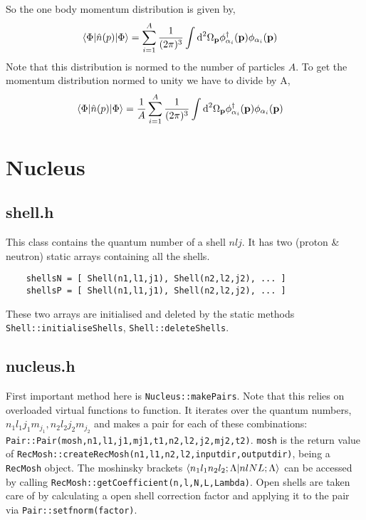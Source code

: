 \documentclass[10pt]{article}
\begin{document}
So the one body momentum distribution is given by,
\begin{align}
	\braket{ \Phi | \hat{n}(p) | \Phi} &=  \sum_{i=1}^{A} \frac{1}{(2 \pi)^{3}} \int \textrm{d}^{2} \Omega_{\mathbf{p}}\phi_{\alpha_i}^{\dagger}(\mathbf{p}) \phi_{\alpha_i}(\mathbf{p})
\end{align}
Note that this distribution is normed to the number of particles $A$. To get the momentum distribution normed to unity we have to divide by A,
\begin{align}
	\braket{ \Phi | \hat{n}(p) | \Phi} &=  \frac{1}{A} \sum_{i=1}^{A} \frac{1}{(2 \pi)^{3}} \int \textrm{d}^{2} \Omega_{\mathbf{p}}\phi_{\alpha_i}^{\dagger}(\mathbf{p}) \phi_{\alpha_i}(\mathbf{p})
\end{align}

\section{Nucleus}
\subsection{shell.h}
This class contains the quantum number of a shell $nlj$. It has two (proton \& neutron) static arrays containing all the shells.
\begin{verbatim}
	shellsN = [ Shell(n1,l1,j1), Shell(n2,l2,j2), ... ]
	shellsP = [ Shell(n1,l1,j1), Shell(n2,l2,j2), ... ]
\end{verbatim}
These two arrays are initialised and deleted by the static methods \texttt{Shell::initialiseShells}, \texttt{Shell::deleteShells}.

\subsection{nucleus.h}
First important method here is \texttt{Nucleus::makePairs}. Note that this relies on overloaded virtual functions to function. It iterates over the quantum numbers, $n_1 l_1 j_1 m_{j_1}, n_2 l_2 j_2 m_{j_2}$ and makes a pair for each of these combinations: \texttt{Pair::Pair(mosh,n1,l1,j1,mj1,t1,n2,l2,j2,mj2,t2)}. \texttt{mosh} is the return value of \texttt{RecMosh::createRecMosh(n1,l1,n2,l2,inputdir,outputdir)}, being a \texttt{RecMosh} object. The moshinsky brackets $\braket{n_1 l_1 n_2 l_2; \Lambda | n l N L ; \Lambda}$ can be accessed by calling \texttt{RecMosh::getCoefficient(n,l,N,L,Lambda)}.
Open shells are taken care of by calculating a open shell correction factor and applying it to the pair via \texttt{Pair::setfnorm(factor)}.
\end{document}
